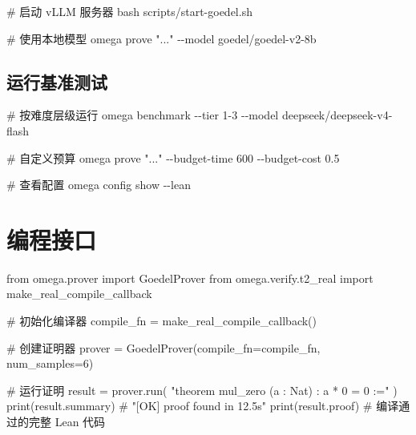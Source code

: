 \documentclass[
  11pt,
  a4paper,
]{ctexrep}
\newenvironment{Shaded}{\begin{snugshade}}{\end{snugshade}}
\newcommand{\AttributeTok}[1]{\textcolor[rgb]{0.40,0.45,0.13}{#1}}
\newcommand{\BuiltInTok}[1]{\textcolor[rgb]{0.00,0.23,0.31}{#1}}
\newcommand{\CommentTok}[1]{\textcolor[rgb]{0.37,0.37,0.37}{#1}}
\newcommand{\DecValTok}[1]{\textcolor[rgb]{0.68,0.00,0.00}{#1}}
\newcommand{\ExtensionTok}[1]{\textcolor[rgb]{0.00,0.23,0.31}{#1}}
\newcommand{\FunctionTok}[1]{\textcolor[rgb]{0.28,0.35,0.67}{#1}}
\newcommand{\ImportTok}[1]{\textcolor[rgb]{0.00,0.46,0.62}{#1}}
\newcommand{\NormalTok}[1]{\textcolor[rgb]{0.00,0.23,0.31}{#1}}
\newcommand{\OperatorTok}[1]{\textcolor[rgb]{0.37,0.37,0.37}{#1}}
\newcommand{\StringTok}[1]{\textcolor[rgb]{0.13,0.47,0.30}{#1}}
\begin{document}
\begin{Shaded}
\begin{Highlighting}[]
\CommentTok{\# 启动 vLLM 服务器}
\FunctionTok{bash}\NormalTok{ scripts/start{-}goedel.sh}

\CommentTok{\# 使用本地模型}
\ExtensionTok{omega}\NormalTok{ prove }\StringTok{"..."} \AttributeTok{{-}{-}model}\NormalTok{ goedel/goedel{-}v2{-}8b}
\end{Highlighting}
\end{Shaded}

\subsection{运行基准测试}\label{ux8fd0ux884cux57faux51c6ux6d4bux8bd5}

\begin{Shaded}
\begin{Highlighting}[]
\CommentTok{\# 按难度层级运行}
\ExtensionTok{omega}\NormalTok{ benchmark }\AttributeTok{{-}{-}tier}\NormalTok{ 1{-}3 }\AttributeTok{{-}{-}model}\NormalTok{ deepseek/deepseek{-}v4{-}flash}

\CommentTok{\# 自定义预算}
\ExtensionTok{omega}\NormalTok{ prove }\StringTok{"..."} \AttributeTok{{-}{-}budget{-}time}\NormalTok{ 600 }\AttributeTok{{-}{-}budget{-}cost}\NormalTok{ 0.5}

\CommentTok{\# 查看配置}
\ExtensionTok{omega}\NormalTok{ config show }\AttributeTok{{-}{-}lean}
\end{Highlighting}
\end{Shaded}

\section{编程接口}\label{sec-api}

\begin{Shaded}
\begin{Highlighting}[]
\ImportTok{from}\NormalTok{ omega.prover }\ImportTok{import}\NormalTok{ GoedelProver}
\ImportTok{from}\NormalTok{ omega.verify.t2\_real }\ImportTok{import}\NormalTok{ make\_real\_compile\_callback}

\CommentTok{\# 初始化编译器}
\NormalTok{compile\_fn }\OperatorTok{=}\NormalTok{ make\_real\_compile\_callback()}

\CommentTok{\# 创建证明器}
\NormalTok{prover }\OperatorTok{=}\NormalTok{ GoedelProver(compile\_fn}\OperatorTok{=}\NormalTok{compile\_fn, num\_samples}\OperatorTok{=}\DecValTok{6}\NormalTok{)}

\CommentTok{\# 运行证明}
\NormalTok{result }\OperatorTok{=}\NormalTok{ prover.run(}
    \StringTok{"theorem mul\_zero (a : Nat) : a * 0 = 0 :="}
\NormalTok{)}
\BuiltInTok{print}\NormalTok{(result.summary)  }\CommentTok{\# "[OK] proof found in 12.5s"}
\BuiltInTok{print}\NormalTok{(result.proof)    }\CommentTok{\# 编译通过的完整 Lean 代码}
\end{Highlighting}
\end{Shaded}
\end{document}
